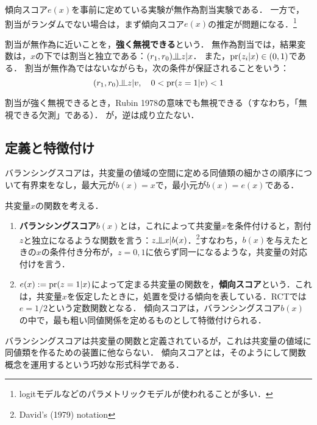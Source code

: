 \documentclass[uplatex,dvipdfmx]{jsreport}
\begin{document}
傾向スコア$e(x)$を事前に定めている実験が無作為割当実験である．
一方で，割当がランダムでない場合は，まず傾向スコア$e(x)$の推定が問題になる．\footnote{logitモデルなどのパラメトリックモデルが使われることが多い．}

\begin{definition}
    割当が無作為に近いことを，\textbf{強く無視できる}という．
    無作為割当では，結果変数は，$x$の下では割当と独立である：$(r_1,r_0)\indep z|x$．
    また，$\mathrm{pr}(z_i|x)\in(0,1)$である．
    割当が無作為ではないながらも，次の条件が保証されることをいう：
    \[(r_1,r_0)\indep z|v,\quad 0<\pr(z=1|v)<1\]
\end{definition}

\begin{lemma}
    割当が強く無視できるとき，Rubin 1978の意味でも無視できる（すなわち，「無視できる欠測」である）．
    が，逆は成り立たない．
\end{lemma}

\subsection{定義と特徴付け}

\begin{tcolorbox}[colframe=ForestGreen, colback=ForestGreen!10!white,breakable,colbacktitle=ForestGreen!40!white,coltitle=black,fonttitle=\bfseries\sffamily,
title=]
    バランシングスコアは，共変量の値域の空間に定める同値類の細かさの順序について有界束をなし，最大元が$b(x)=x$で，最小元が$b(x)=e(x)$である．
\end{tcolorbox}

\begin{definition}
    共変量$x$の関数を考える．
    \begin{enumerate}
        \item \textbf{バランシングスコア}$b(x)$とは，これによって共変量$x$を条件付けると，割付$z$と独立になるような関数を言う：$z\indep x|b(x)$．\footnote{David's (1979) notation}すなわち，$b(x)$を与えたときの$x$の条件付き分布が，$z=0,1$に依らず同一になるような，共変量の対応付けを言う．
        \item $e(x):=\mathrm{pr}(z=1|x)$によって定まる共変量の関数を，\textbf{傾向スコア}という．これは，共変量$x$を仮定したときに，処置を受ける傾向を表している．RCTでは$e=1/2$という定数関数となる．
        傾向スコアは，バランシングスコア$b(x)$の中で，最も粗い同値関係を定めるものとして特徴付けられる．
    \end{enumerate}
\end{definition}
\begin{remarks}
    バランシングスコアは共変量の関数と定義されているが，これは共変量の値域に同値類を作るための装置に他ならない．
    傾向スコアとは，そのようにして関数概念を運用するという巧妙な形式科学である．
\end{remarks}
\end{document}
